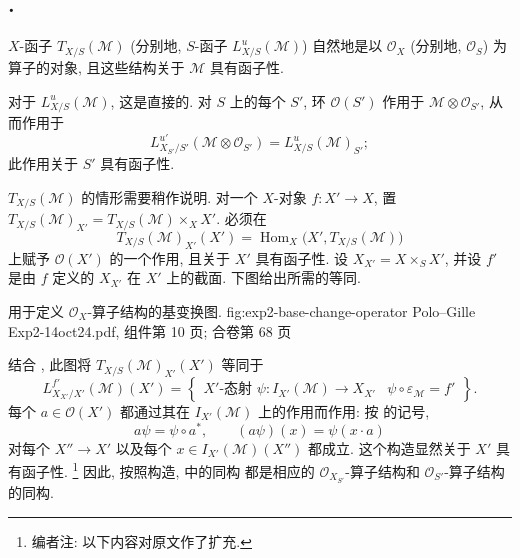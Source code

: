 \subsection*{.}
\(X\)-函子 \(T_{X/S}(\mathcal M)\) (分别地, \(S\)-函子
\(L^u_{X/S}(\mathcal M)\)) 自然地是以 \(\mathcal O_X\)
(分别地, \(\mathcal O_S\)) 为算子的对象,
且这些结构关于 \(\mathcal M\) 具有函子性.

对于 \(L^u_{X/S}(\mathcal M)\), 这是直接的.
对 \(S\) 上的每个 \(S'\), 环 \(\mathcal O(S')\) 作用于
\(\mathcal M\otimes\mathcal O_{S'}\), 从而作用于
\[
  L^{u'}_{X_{S'}/S'}(\mathcal M\otimes\mathcal O_{S'})
  =L^u_{X/S}(\mathcal M)_{S'};
\]
此作用关于 \(S'\) 具有函子性.

\(T_{X/S}(\mathcal M)\) 的情形需要稍作说明.
对一个 \(X\)-对象 \(f:X'\to X\), 置
\(T_{X/S}(\mathcal M)_{X'}=T_{X/S}(\mathcal M)\times_X X'\).
必须在
\[
  T_{X/S}(\mathcal M)_{X'}(X')
  =\operatorname{Hom}_X\bigl(X',T_{X/S}(\mathcal M)\bigr)
\]
上赋予 \(\mathcal O(X')\) 的一个作用, 且关于 \(X'\) 具有函子性.
设 \(X_{X'}=X\times_S X'\), 并设 \(f'\) 是由 \(f\) 定义的
\(X_{X'}\) 在 \(X'\) 上的截面. 下图给出所需的等同.

  {用于定义 \(\mathcal O_X\)-算子结构的基变换图.}
  {fig:exp2-base-change-operator}
  {Polo--Gille Exp2-14oct24.pdf, 组件第 10 页; 合卷第 68 页}

结合 , 此图将
\(T_{X/S}(\mathcal M)_{X'}(X')\) 等同于
\[
  L^{f'}_{X_{X'}/X'}(\mathcal M)(X')
  =\left\{
    \begin{array}{c|c}
      X'\text{-态射 }\psi:I_{X'}(\mathcal M)\to X_{X'}
      &\psi\circ\varepsilon_{\mathcal M}=f'
    \end{array}
  \right\}.
\]
每个 \(a\in\mathcal O(X')\) 都通过其在 \(I_{X'}(\mathcal M)\) 上的作用而作用:
按  的记号,
\[
  a\psi=\psi\circ a^*,
  \qquad (a\psi)(x)=\psi(x\cdot a)
\]
对每个 \(X''\to X'\) 以及每个 \(x\in I_{X'}(\mathcal M)(X'')\) 都成立.
这个构造显然关于 \(X'\) 具有函子性.
\footnote{编者注: 以下内容对原文作了扩充.}
因此, 按照构造,  中的同构
都是相应的 \(\mathcal O_{X_{S'}}\)-算子结构和
\(\mathcal O_{S'}\)-算子结构的同构.

